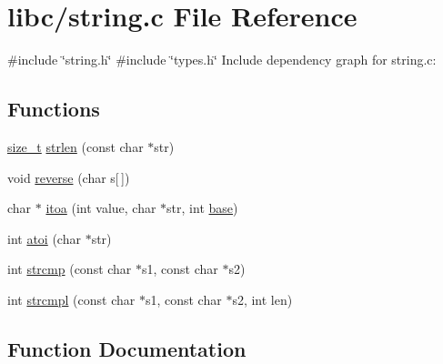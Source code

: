 \hypertarget{a00119}{}\section{libc/string.c File Reference}
\label{a00119}
{\ttfamily \#include \char`\"{}string.\+h\char`\"{}}\newline
{\ttfamily \#include \char`\"{}types.\+h\char`\"{}}\newline
Include dependency graph for string.\+c\+:
\subsection*{Functions}
\begin{DoxyCompactItemize}
\item 
\hyperlink{a00134_a29d85914ddff32967d85ada69854206d_a29d85914ddff32967d85ada69854206d}{size\+\_\+t} \hyperlink{a00119_a008e171a518fe0e0352f31b245e03875_a008e171a518fe0e0352f31b245e03875}{strlen} (const char $\ast$str)
\item 
void \hyperlink{a00119_aa8a9a8836962d890b4939c112fd29190_aa8a9a8836962d890b4939c112fd29190}{reverse} (char s\mbox{[}$\,$\mbox{]})
\item 
char $\ast$ \hyperlink{a00119_ab42640268f26e065efd044cfe80591bd_ab42640268f26e065efd044cfe80591bd}{itoa} (int value, char $\ast$str, int \hyperlink{a00104_a0523cedff47e2441fc198b7770ec5d3f_a0523cedff47e2441fc198b7770ec5d3f}{base})
\item 
int \hyperlink{a00119_a8456d79947fb428e0927d19e7a1e9423_a8456d79947fb428e0927d19e7a1e9423}{atoi} (char $\ast$str)
\item 
int \hyperlink{a00119_a11bd144d7d44914099a3aeddf1c8567d_a11bd144d7d44914099a3aeddf1c8567d}{strcmp} (const char $\ast$s1, const char $\ast$s2)
\item 
int \hyperlink{a00119_a3c8c44ba2ae232bc5ae8449de1448164_a3c8c44ba2ae232bc5ae8449de1448164}{strcmpl} (const char $\ast$s1, const char $\ast$s2, int len)
\end{DoxyCompactItemize}


\subsection{Function Documentation}
\mbox{\label{a00119_a8456d79947fb428e0927d19e7a1e9423_a8456d79947fb428e0927d19e7a1e9423}} 
